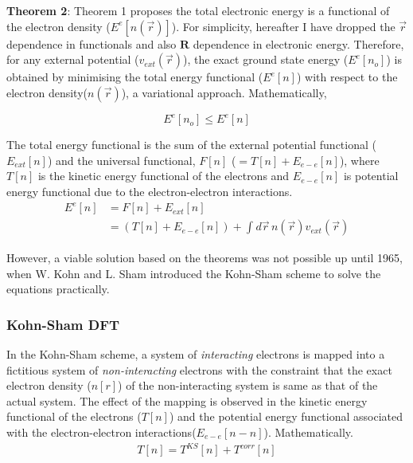 \noindent \textbf{Theorem 2}: Theorem 1 proposes the total electronic energy is a functional of the electron density ($E^e[n(\vec{r})]$). For simplicity, hereafter I have dropped the $\vec{r}$ dependence in functionals and also $\textbf{R}$ dependence in electronic energy. Therefore, for any external potential ($v_{ext}(\vec{r})$), the exact ground state energy ($E^e[n_o]$) is obtained by minimising the total energy functional ($E^e[n]$) with respect to the electron density($n(\vec{r})$), a variational approach. Mathematically,


 
\begin{equation}
     E^e [n_o] \leq E^e [n]
      \label{DFT-2}
\end{equation}
 
\noindent The total energy functional is the sum of the external potential functional ($E_{ext}[n]$) and the universal functional, $F[n]$ ($= T[n] + E_{e-e}[n]$), where $T[n]$ is the kinetic energy functional of the electrons and $E_{e-e}[n]$ is potential energy functional due to the electron-electron interactions. 
\begin{align}
     \label{DFT-3}
     E^e[n] &= F[n] + E_{ext}[n]   \\ 
            &= (T[n] + E_{e-e}[n]) + \int_{}^{}d\vec{r} \, n(\vec{r})v_{ext}(\vec{r}) 
\end{align}

\noindent However, a viable solution based on the theorems was not possible up until 1965, when  W. Kohn and L. Sham introduced the Kohn-Sham scheme\cite{DFT_KS1965} to solve the equations practically.   
 
\subsubsection*{Kohn-Sham DFT}

\noindent In the Kohn-Sham scheme, a system of \textit{interacting} electrons is mapped into a fictitious system of \textit{non-interacting} electrons with the constraint that the exact electron density ($n[r]$) of the non-interacting system is same as that of the actual system. The effect of the mapping is observed in the kinetic energy functional of the electrons ($T[n]$) and the potential energy functional associated with the electron-electron interactions($E_{e-e}[n-n]$). Mathematically.
\begin{align}
    T [n] = T^{KS} [n] + T^{corr} [n] \label{DFT-4}
\end{align}

